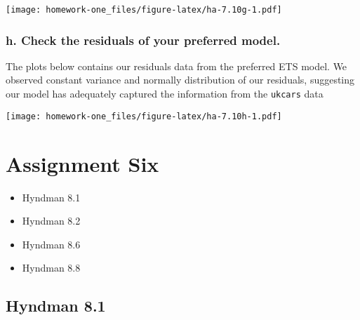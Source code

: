 \documentclass[openany]{book}
\newenvironment{Shaded}{\begin{snugshade}}{\end{snugshade}}
\newcommand{\DataTypeTok}[1]{\textcolor[rgb]{0.13,0.29,0.53}{#1}}
\newcommand{\KeywordTok}[1]{\textcolor[rgb]{0.13,0.29,0.53}{\textbf{#1}}}
\newcommand{\NormalTok}[1]{#1}
\newcommand{\OperatorTok}[1]{\textcolor[rgb]{0.81,0.36,0.00}{\textbf{#1}}}
\newcommand{\OtherTok}[1]{\textcolor[rgb]{0.56,0.35,0.01}{#1}}
\newcommand{\StringTok}[1]{\textcolor[rgb]{0.31,0.60,0.02}{#1}}
\providecommand{\tightlist}{%
  \setlength{\itemsep}{0pt}\setlength{\parskip}{0pt}}
\begin{document}
\texttt{[image: homework-one\_files/figure-latex/ha-7.10g-1.pdf]}

\hypertarget{h.-check-the-residuals-of-your-preferred-model.}{%
\subsection{h. Check the residuals of your preferred model.}\label{h.-check-the-residuals-of-your-preferred-model.}}

The plots below contains our residuals data from the preferred ETS model. We observed constant variance and normally distribution of our residuals, suggesting our model has adequately captured the information from the \texttt{ukcars} data

\begin{Shaded}
\end{Shaded}

\texttt{[image: homework-one\_files/figure-latex/ha-7.10h-1.pdf]}

\hypertarget{assignment-six}{%
\chapter{Assignment Six}\label{assignment-six}}

\begin{itemize}
\tightlist
\item
  Hyndman 8.1
\item
  Hyndman 8.2
\item
  Hyndman 8.6
\item
  Hyndman 8.8
\end{itemize}

\hypertarget{hyndman-8.1}{%
\section{Hyndman 8.1}\label{hyndman-8.1}}
\end{document}

